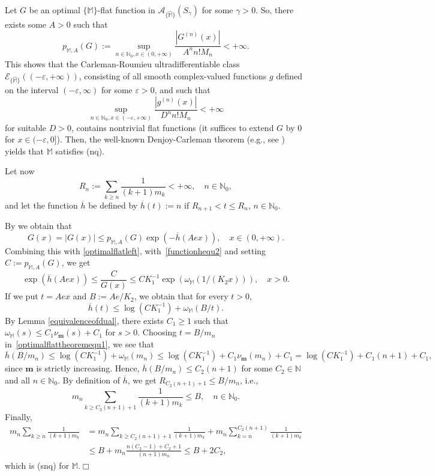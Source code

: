 \documentclass[11pt,a4paper]{article}
\theoremstyle{plain}
\theoremstyle{definition}
\newcommand{\N}{\mathbb{N}}
\newcommand{\M}{\mathbb{M}}
\newcommand{\hM}{\widehat{\M}}
\newcommand{\m}{\boldsymbol{m}}
\begin{document}
Let $G$ be an optimal $\{\M\}$-flat function in $\mathcal{A}_{\{\hM\}}(S_{\gamma})$ for some $\gamma>0$.
So, there exists some $A>0$ such that
$$
p_{\M,A}(G):=\sup_{n\in\N_0,x\in(0,+\infty)}\frac{|G^{(n)}(x)|}{A^n n!M_n}<+\infty.
$$
This shows that the Carleman-Roumieu ultradifferentiable class $\mathcal{E}_{\{\hM\}}((-\varepsilon,+\infty))$, consisting of all smooth complex-valued functions $g$ defined on the interval $(-\varepsilon,\infty)$ for some $\varepsilon>0$, and such that $$\sup_{n\in\N_0,x\in(-\varepsilon,+\infty)}\frac{|g^{(n)}(x)|}{D^n n!M_n}<+\infty
$$
for suitable $D>0$, contains nontrivial flat functions (it suffices to extend $G$ by 0 for $x\in(-\varepsilon,0]$). Then, the well-known Denjoy-Carleman theorem (e.g., see \cite[Th.~1.3.8]{hoermander}) yields that $\M$ satisfies (nq).

Let now
$$
R_n:=\sum_{k\ge n}\frac{1}{(k+1)m_k}<+\infty,\quad n\in\N_0,
$$
and let the function $\overline{h}$ be defined by $\overline{h}(t):=n$ if $R_{n+1}<t\le R_n$, $n\in\N_0$.

By \cite[$(14)$, p. 142]{Bang53} we obtain that
$$
G(x)=|G(x)|\le p_{\M,A}(G)\exp\left(-\overline{h}(Aex)\right),\quad x\in(0,+\infty).
$$
Combining this with \eqref{optimalflatleft}, with~\eqref{functionhequ2} and setting $C:=p_{\M,A}(G)$, we get
$$
\exp\left(\overline{h}(Aex)\right)\le\frac{C}{G(x)}\le C K_1^{-1}\exp(\omega_{\M}(1/(K_2x))),\quad x>0.
$$
If we put $t=Aex$ and $B:=Ae/K_2$, we obtain that for every $t>0$,
\begin{equation}\label{optimalflattheoremequ1}
\overline{h}(t)\le \log(C K_1^{-1}) +\omega_{\M}(B/t).
\end{equation}
By Lemma \ref{equivalenceofdual}, there exists $C_1\ge 1$ such that $\omega_\M(s)\le C_1\nu_{\m}(s)+C_1$ for $s>0$. Choosing $t=B/m_n$ in~\eqref{optimalflattheoremequ1}, we see that
$$
\overline{h}(B/m_n)\le \log(C K_1^{-1}) +\omega_{\M}(m_n)\le \log(C K_1^{-1}) +C_1\nu_{\m}(m_n)+C_1=\log(C K_1^{-1}) +C_1(n+1)+C_1,
$$
since $\m$ is strictly increasing. Hence, $\overline{h}(B/m_n)\le C_2(n+1)$ for some $C_2\in\N$ and all $n\in\N_0$. By definition of $\overline{h}$, we get $R_{C_2(n+1)+1}\leq B/m_n$, i.e.,
$$
m_n\sum_{k\ge C_2(n+1)+1}\frac{1}{(k+1)m_k}\le B,\quad n\in\N_0.
$$
Finally,
\begin{align*}
	m_n\sum_{k\ge n}\frac{1}{(k+1)m_k}&=m_n\sum_{k\ge C_2(n+1)+1}\frac{1}{(k+1)m_k}+m_n\sum_{k=n}^{C_2(n+1)}\frac{1}{(k+1)m_k}\\
	&\le B+m_n\frac{n(C_2-1)+C_2+1}{(n+1)m_{n}}\le B+2C_2,
\end{align*}
which is (snq) for $\M$.\hfill$\Box$
\end{document}
